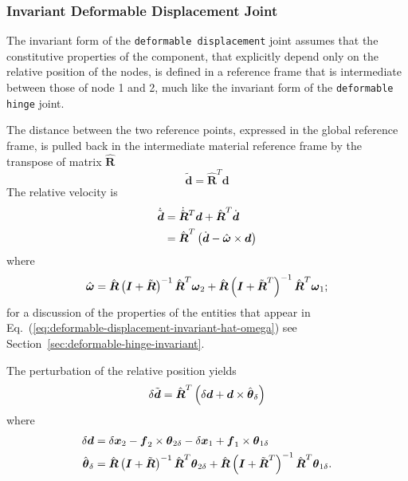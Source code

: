 \documentclass[10pt,dvips,fleqn]{report}
\newcommand{\T}[1]{\boldsymbol{#1}}
\newcommand{\TT}[1]{\boldsymbol{#1}}
\begin{document}
\subsubsection{Invariant Deformable Displacement Joint}
The invariant form of the \texttt{deformable displacement} joint
assumes that the constitutive properties of the component,
that explicitly depend only on the relative position 
of the nodes, is defined in a reference frame that is intermediate
between those of node 1 and 2, much like the invariant form
of the \texttt{deformable hinge} joint.

The distance between the two reference points, expressed
in the global reference frame, is pulled back in the 
intermediate material reference frame by the transpose
of matrix $\hat{\TT{R}}$
\begin{equation}
	\tilde{\T{d}} = \hat{\TT{R}}^T \T{d}
\end{equation}
The relative velocity is
\begin{align}
	\dot{\tilde{\T{d}}}
	&= \dot{\hat{\TT{R}}}^T \T{d} + \hat{\TT{R}}^T \dot{\T{d}}
		\nonumber \\
	&= \hat{\TT{R}}^T \plbr{
		\dot{\T{d}} - \hat{\T{\omega}} \times \T{d}
	}
\end{align}
where
\begin{equation}
	\hat{\T{\omega}}
	= \hat{\TT{R}} \plbr{\T{I} + \tilde{\T{R}}}^{-1} \hat{\TT{R}}^T \T{\omega}_2
	+ \hat{\TT{R}} \plbr{\T{I} + \tilde{\T{R}}^T}^{-1} \hat{\TT{R}}^T \T{\omega}_1 ;
	\label{eq:deformable-displacement-invariant-hat-omega}
\end{equation}
for a discussion of the properties of the entities
that appear in Eq.~(\ref{eq:deformable-displacement-invariant-hat-omega})
see Section~\ref{sec:deformable-hinge-invariant}.

The perturbation of the relative position yields
\begin{equation}
	\delta\tilde{\T{d}} = \hat{\TT{R}}^T \plbr{
		\delta\T{d} + \T{d} \times \hat{\T{\theta}}_{\delta}
	}
\end{equation}
where
\begin{align}
	\delta\T{d}
	&= \delta\T{x}_2 - \T{f}_2 \times \T{\theta}_{2\delta}
		- \delta\T{x}_1 + \T{f}_1 \times \T{\theta}_{1\delta} \\
	\hat{\T{\theta}}_{\delta}
	&= \hat{\TT{R}} \plbr{\T{I} + \tilde{\T{R}}}^{-1} \hat{\TT{R}}^T \T{\theta}_{2\delta}
	+ \hat{\TT{R}} \plbr{\T{I} + \tilde{\T{R}}^T}^{-1} \hat{\TT{R}}^T \T{\theta}_{1\delta} .
\end{align}
\end{document}
